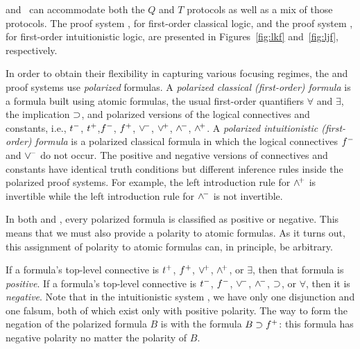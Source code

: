 
\LKF and \LJF ~\cite{LiaMil09}can accommodate both the $Q$ and $T$ protocols as well
as a mix of those protocols.
%
The proof system \LKF, for first-order classical logic, and the
proof system \LJF, for first-order intuitionistic logic, are
presented in Figures~\ref{fig:lkf} and~\ref{fig:ljf}, respectively.

In order to obtain their flexibility in capturing various focusing
regimes, the \LKF and \LJF proof systems use \emph{polarized}
formulas.
%
A \emph{polarized classical (first-order) formula} is a formula built
using atomic formulas, 
the usual first-order quantifiers $\forall$ and $\exists$, the implication
$\supset$, and polarized versions of the logical connectives and
constants, i.e., $t^-$, $t^+$,$f^-$, $f^+$, $\vee^{\!-}$,
$\vee^{\!+}$, $\wedge^{\!-}$, $\wedge^{\!+}$.
%
A \emph{polarized intuitionistic (first-order) formula} is a polarized
classical formula in which the logical connectives $f^-$ and
$\vee^{\!-}$ do not occur.
%
The positive and negative versions of connectives and constants
have identical truth conditions but different inference rules
inside the polarized proof systems.
%
For example, the left introduction rule for $\wedge^{\!+}$ is invertible
while the left introduction rule for $\wedge^{\!-}$ is not invertible.

In both \LKF and \LJF, every polarized formula is classified as
positive or negative.
%
This means that we must also provide a polarity to atomic formulas.
%
As it turns out, this assignment of polarity to atomic formulas can,
in principle, be arbitrary.

If a formula's top-level connective is $t^+$,
$f^+$, $\vee^{\!+}$, $\wedge^{\!+}$, or $\exists$, then that formula is
\emph{positive}.
%
If a formula's top-level connective is $t^-$, $f^-$,
$\vee^{\!-}$, $\wedge^{\!-}$, $\supset$, or $\forall$, then it is \emph{negative}.
%
Note that in the intuitionistic system \LJF, we have only one
disjunction and one falsum, both of which exist only with positive
polarity.
%
The way to form the negation of the polarized formula $B$ is with the
formula $B\supset f^+$: this formula has negative polarity no matter
the polarity of $B$.

